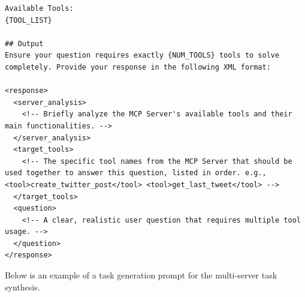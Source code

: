 \begin{verbatim}
Available Tools:
{TOOL_LIST}

## Output
Ensure your question requires exactly {NUM_TOOLS} tools to solve completely. Provide your response in the following XML format:

<response>
  <server_analysis>
    <!-- Briefly analyze the MCP Server's available tools and their main functionalities. -->
  </server_analysis>
  <target_tools>
    <!-- The specific tool names from the MCP Server that should be used together to answer this question, listed in order. e.g., <tool>create_twitter_post</tool> <tool>get_last_tweet</tool> -->
  </target_tools>
  <question>
    <!-- A clear, realistic user question that requires multiple tool usage. -->
  </question>
</response>
\end{verbatim}

Below is an example of a task generation prompt for the multi-server task synthesis. 


